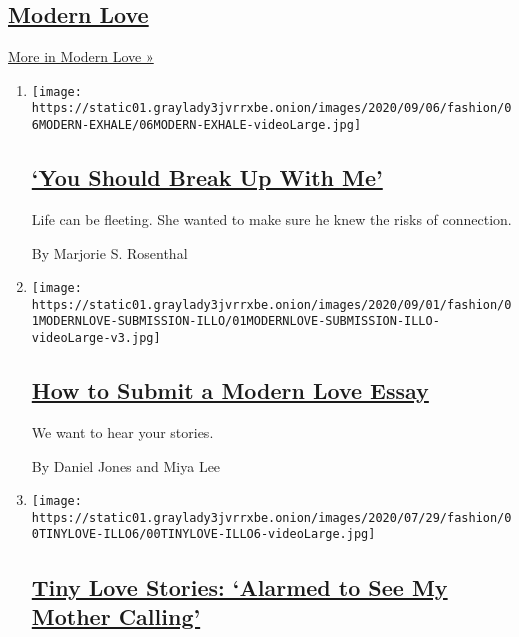 \hypertarget{modern-love}{%
\subsection{\texorpdfstring{\href{/column/modern-love}{Modern
Love}}{Modern Love}}\label{modern-love}}

\href{/column/modern-love}{More in Modern Love »}

\begin{enumerate}
\def\labelenumi{\arabic{enumi}.}
\item
  \texttt{[image: https://static01.graylady3jvrrxbe.onion/images/2020/09/06/fashion/06MODERN-EXHALE/06MODERN-EXHALE-videoLarge.jpg]}

  \hypertarget{you-should-break-up-with-me}{%
  \subsection{\texorpdfstring{\href{/2020/09/04/style/modern-love-widow-cancer-break-up-with-me.html}{`You
  Should Break Up With
  Me'}}{`You Should Break Up With Me'}}\label{you-should-break-up-with-me}}

  Life can be fleeting. She wanted to make sure he knew the risks of
  connection.

  By Marjorie S. Rosenthal
\item
  \texttt{[image: https://static01.graylady3jvrrxbe.onion/images/2020/09/01/fashion/01MODERNLOVE-SUBMISSION-ILLO/01MODERNLOVE-SUBMISSION-ILLO-videoLarge-v3.jpg]}

  \hypertarget{how-to-submit-a-modern-love-essay}{%
  \subsection{\texorpdfstring{\href{/article/how-to-submit-a-modern-love-essay.html}{How
  to Submit a Modern Love
  Essay}}{How to Submit a Modern Love Essay}}\label{how-to-submit-a-modern-love-essay}}

  We want to hear your stories.

  By Daniel Jones and Miya Lee
\item
  \texttt{[image: https://static01.graylady3jvrrxbe.onion/images/2020/07/29/fashion/00TINYLOVE-ILLO6/00TINYLOVE-ILLO6-videoLarge.jpg]}

  \hypertarget{tiny-love-stories-alarmed-to-see-my-mother-calling}{%
  \subsection{\texorpdfstring{\href{/2020/09/01/style/tiny-modern-love-stories-alarmed-to-see-my-mother-calling.html}{Tiny
  Love Stories: `Alarmed to See My Mother
  Calling'}}{Tiny Love Stories: `Alarmed to See My Mother Calling'}}\label{tiny-love-stories-alarmed-to-see-my-mother-calling}}


\end{enumerate}
